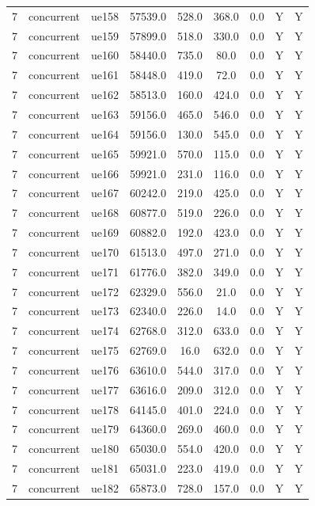 \begin{table}[ht]
\begin{tabular}{|c|c|c|c|c|c|c|c|c|}
7 & concurrent & ue158 & 57539.0 & 528.0 & 368.0 & 0.0 & Y & Y \\
7 & concurrent & ue159 & 57899.0 & 518.0 & 330.0 & 0.0 & Y & Y \\
7 & concurrent & ue160 & 58440.0 & 735.0 & 80.0 & 0.0 & Y & Y \\
7 & concurrent & ue161 & 58448.0 & 419.0 & 72.0 & 0.0 & Y & Y \\
7 & concurrent & ue162 & 58513.0 & 160.0 & 424.0 & 0.0 & Y & Y \\
7 & concurrent & ue163 & 59156.0 & 465.0 & 546.0 & 0.0 & Y & Y \\
7 & concurrent & ue164 & 59156.0 & 130.0 & 545.0 & 0.0 & Y & Y \\
7 & concurrent & ue165 & 59921.0 & 570.0 & 115.0 & 0.0 & Y & Y \\
7 & concurrent & ue166 & 59921.0 & 231.0 & 116.0 & 0.0 & Y & Y \\
7 & concurrent & ue167 & 60242.0 & 219.0 & 425.0 & 0.0 & Y & Y \\
7 & concurrent & ue168 & 60877.0 & 519.0 & 226.0 & 0.0 & Y & Y \\
7 & concurrent & ue169 & 60882.0 & 192.0 & 423.0 & 0.0 & Y & Y \\
7 & concurrent & ue170 & 61513.0 & 497.0 & 271.0 & 0.0 & Y & Y \\
7 & concurrent & ue171 & 61776.0 & 382.0 & 349.0 & 0.0 & Y & Y \\
7 & concurrent & ue172 & 62329.0 & 556.0 & 21.0 & 0.0 & Y & Y \\
7 & concurrent & ue173 & 62340.0 & 226.0 & 14.0 & 0.0 & Y & Y \\
7 & concurrent & ue174 & 62768.0 & 312.0 & 633.0 & 0.0 & Y & Y \\
7 & concurrent & ue175 & 62769.0 & 16.0 & 632.0 & 0.0 & Y & Y \\
7 & concurrent & ue176 & 63610.0 & 544.0 & 317.0 & 0.0 & Y & Y \\
7 & concurrent & ue177 & 63616.0 & 209.0 & 312.0 & 0.0 & Y & Y \\
7 & concurrent & ue178 & 64145.0 & 401.0 & 224.0 & 0.0 & Y & Y \\
7 & concurrent & ue179 & 64360.0 & 269.0 & 460.0 & 0.0 & Y & Y \\
7 & concurrent & ue180 & 65030.0 & 554.0 & 420.0 & 0.0 & Y & Y \\
7 & concurrent & ue181 & 65031.0 & 223.0 & 419.0 & 0.0 & Y & Y \\
7 & concurrent & ue182 & 65873.0 & 728.0 & 157.0 & 0.0 & Y & Y \\

\end{tabular}
\end{table}
